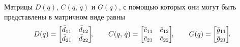 Матрицы $D(q)$, $C(q,\,\dot{q})$ и $G(q)$, с помощью которых они могут быть представлены в матричном виде равны
\begin{equation}\label{eq_matrices_from_first_example}
    D(q) =
    \begin{bmatrix}
        \bar{d}_{11} & \bar{d}_{12} \\
        \bar{d}_{21} & \bar{d}_{22}
    \end{bmatrix}\!\!,
    \qquad
    C(q,\,\dot{q}) =
    \begin{bmatrix}
        \bar{c}_{11} & \bar{c}_{12} \\
        \bar{c}_{21} & \bar{c}_{22}
    \end{bmatrix}\!\!,
    \qquad
    G(q) =
    \begin{bmatrix}
        \bar{g}_{11} \\ \bar{g}_{21}
    \end{bmatrix}\!\! \ldotp
\end{equation}


